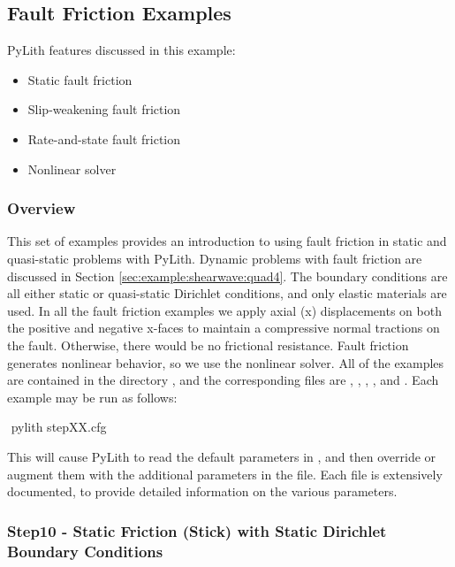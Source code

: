 \subsection{Fault Friction Examples}
\label{sec:example:3dhex8:friction}

PyLith features discussed in this example:
\begin{itemize}
\item Static fault friction
\item Slip-weakening fault friction
\item Rate-and-state fault friction
\item Nonlinear solver
\end{itemize}

\subsubsection{Overview}

This set of examples provides an introduction to using fault friction
in static and quasi-static problems with PyLith. Dynamic problems
with fault friction are discussed in Section \vref{sec:example:shearwave:quad4}.
The boundary conditions are all either static or quasi-static Dirichlet
conditions, and only elastic materials are used. In all the fault
friction examples we apply axial (x) displacements on both the positive
and negative x-faces to maintain a compressive normal tractions on
the fault. Otherwise, there would be no frictional resistance. Fault
friction generates nonlinear behavior, so we use the nonlinear solver.
All of the examples are contained in the directory ,
and the corresponding  files are ,
, , , and
. Each example may be run as follows:
\begin{shell}
$$ pylith stepXX.cfg
\end{shell}
This will cause PyLith to read the default parameters in ,
and then override or augment them with the additional parameters in
the  file. Each  file is extensively
documented, to provide detailed information on the various parameters.


\subsubsection{Step10 - Static Friction (Stick) with Static Dirichlet Boundary Conditions}

